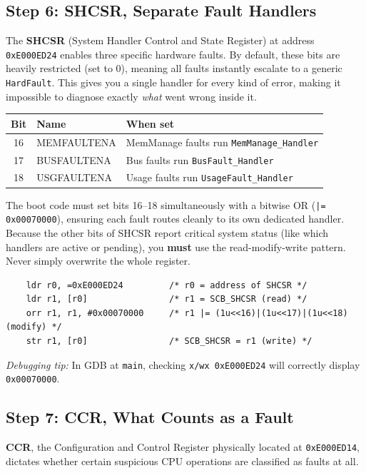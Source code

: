 \subsection{Step 6: SHCSR, Separate Fault Handlers}
The \textbf{SHCSR} (System Handler Control and State Register) at address \texttt{0xE000ED24} enables three specific hardware faults. By default, these bits are heavily restricted (set to 0), meaning all faults instantly escalate to a generic \texttt{HardFault}. This gives you a single handler for every kind of error, making it impossible to diagnose exactly \textit{what} went wrong inside it.

\begin{table}[h!]
    \centering
    \begin{tabular}{|c|l|l|}
        \hline
        \textbf{Bit} & \textbf{Name} & \textbf{When set} \\ \hline
        16 & MEMFAULTENA & MemManage faults run \texttt{MemManage\_Handler} \\ \hline
        17 & BUSFAULTENA & Bus faults run \texttt{BusFault\_Handler} \\ \hline
        18 & USGFAULTENA & Usage faults run \texttt{UsageFault\_Handler} \\ \hline
    \end{tabular}
\end{table}

The boot code must set bits 16--18 simultaneously with a bitwise OR (\texttt{|= 0x00070000}), ensuring each fault routes cleanly to its own dedicated handler. Because the other bits of SHCSR report critical system status (like which handlers are active or pending), you \textbf{must} use the read-modify-write pattern. Never simply overwrite the whole register.

\begin{lstlisting}
    ldr r0, =0xE000ED24         /* r0 = address of SHCSR */
    ldr r1, [r0]                /* r1 = SCB_SHCSR (read) */
    orr r1, r1, #0x00070000     /* r1 |= (1u<<16)|(1u<<17)|(1u<<18) (modify) */
    str r1, [r0]                /* SCB_SHCSR = r1 (write) */
\end{lstlisting}

\textit{Debugging tip:} In GDB at \texttt{main}, checking \texttt{x/wx 0xE000ED24} will correctly display \texttt{0x00070000}.


\subsection{Step 7: CCR, What Counts as a Fault}
\textbf{CCR}, the Configuration and Control Register physically located at \texttt{0xE000ED14}, dictates whether certain suspicious CPU operations are classified as faults at all.


